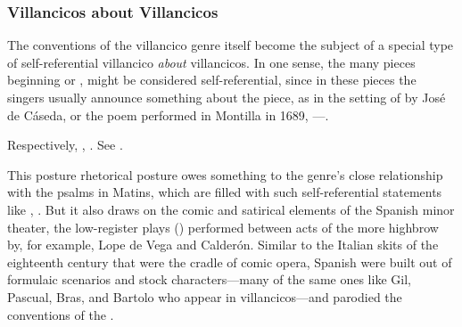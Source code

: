 \subsubsection{Villancicos about Villancicos}

The conventions of the villancico genre itself become the subject of a special
type of self-referential villancico \emph{about} villancicos.
In one sense, the many pieces beginning  or , might be considered self-referential, since in these pieces the
singers usually announce something about the piece, as in the setting of
 by José de Cáseda, or the poem performed in
Montilla in 1689, ---.%
\begin{Footnote}
    Respectively, , \autocite[116 (no signature
    listed)]{BNE:VCs17C}.
    See \autocite{LeGuin:Tonadilla}.
\end{Footnote}
This posture rhetorical posture owes something to the genre's close
relationship with the psalms in Matins, which are filled with such
self-referential statements like ,
.
But it also draws on the comic and satirical elements of the Spanish minor
theater, the low-register plays () performed between acts of
the more highbrow  by, for example, Lope de Vega and Calderón.%
    \Autocite{Cotarelo:Entremeses}
Similar to the Italian  skits of the eighteenth
century that were the cradle of comic opera, Spanish  were
built out of formulaic scenarios and stock characters---many of the same ones
like Gil, Pascual, Bras, and Bartolo who appear in villancicos---and parodied
the conventions of the .

